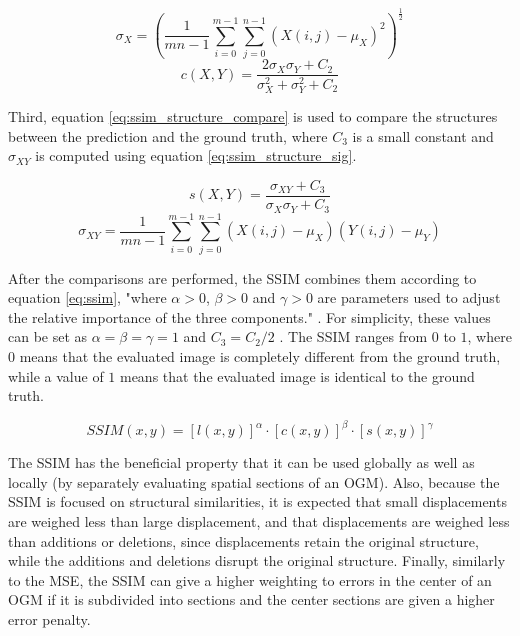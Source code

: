 \begin{equation} \label{eq:ssim_contrast}
	\sigma_X = \left(\frac{1}{mn-1}\sum_{i=0}^{m-1}\sum_{j=0}^{n-1}(X(i,j) - \mu_X)^2 \right)^\frac{1}{2}
\end{equation}
\begin{equation} \label{eq:ssim_contrast_compare}
	c(X,Y) = \frac{2\sigma_X \sigma_Y + C_2}{\sigma_X ^2 + \sigma_Y ^2 + C_2}
\end{equation}

Third, equation \ref{eq:ssim_structure_compare} is used to compare the structures between the prediction and the ground truth, where $C_3$ is a small constant and $\sigma_{XY}$ is computed using equation \ref{eq:ssim_structure_sig}.

\begin{equation} \label{eq:ssim_structure_compare}
	s(X,Y) = \frac{\sigma_{XY}+C_3}{\sigma_X\sigma_Y+C_3}
\end{equation}
\begin{equation} \label{eq:ssim_structure_sig}
	\sigma_{XY} = \frac{1}{mn-1}\sum_{i=0}^{m-1}\sum_{j=0}^{n-1}(X(i,j)-\mu_X)(Y(i,j) -\mu_Y)
\end{equation}

After the comparisons are performed, the \gls{SSIM} combines them according to equation \ref{eq:ssim}, "where $\alpha > 0$, $\beta > 0$ and $\gamma > 0$ are parameters used to adjust the relative importance of the three components." \cite{wang2004image}. For simplicity, these values can be set as $\alpha = \beta = \gamma = 1$ and $C_3 = C_2/2$ \cite{wang2004image}. The \gls{SSIM} ranges from $0$ to $1$, where $0$ means that the evaluated image is completely different from the ground truth, while a value of $1$ means that the evaluated image is identical to the ground truth.

\begin{equation} \label{eq:ssim}
	SSIM(x,y) = [l(x,y)]^\alpha \cdot [c(x,y)]^\beta \cdot [s(x,y)]^\gamma
\end{equation}

The \gls{SSIM} has the beneficial property that it can be used globally as well as locally (by separately evaluating spatial sections of an \gls{OGM}). Also, because the \gls{SSIM} is focused on structural similarities, it is expected that small displacements are weighed less than large displacement, and that displacements are weighed less than additions or deletions, since displacements retain the original structure, while the additions and deletions disrupt the original structure. Finally, similarly to the \gls{MSE}, the \gls{SSIM} can give a higher weighting to errors in the center of an \gls{OGM} if it is subdivided into sections and the center sections are given a higher error penalty.


